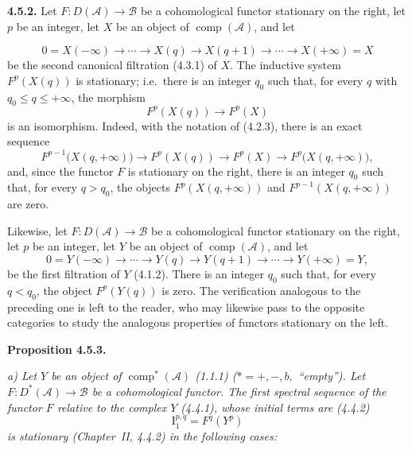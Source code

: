 \clearpage
{}%
\begingroup\small\setlength{\parskip}{0pt}\setlength{\emergencystretch}{1.5em}
\setlength{\abovedisplayskip}{4pt plus 2pt minus 2pt}%
\setlength{\belowdisplayskip}{4pt plus 2pt minus 2pt}%

\noindent\textbf{4.5.2.}\quad
Let $F\colon D(\mathcal A)\longrightarrow\mathcal B$ be a cohomological
functor stationary on the right, let $p$ be an integer, let $X$ be an
object of $\operatorname{comp}(\mathcal A)$, and let

\[
0=X(-\infty)\longrightarrow\cdots\longrightarrow X(q)
\longrightarrow X(q+1)\longrightarrow\cdots
\longrightarrow X(+\infty)=X
\]
be the second canonical filtration (4.3.1) of $X$. The inductive system
$F^p(X(q))$ is stationary; i.e.\ there is an integer $q_0$ such that, for
every $q$ with $q_0\leq q\leq+\infty$, the morphism
\[
F^p(X(q))\longrightarrow F^p(X)
\]
is an isomorphism. Indeed, with the notation of (4.2.3), there is an exact
sequence
\[
F^{p-1}\bigl(X(q,+\infty)\bigr)\longrightarrow F^p(X(q))
\longrightarrow F^p(X)\longrightarrow F^p\bigl(X(q,+\infty)\bigr),
\]
and, since the functor $F$ is stationary on the right, there is an integer
$q_0$ such that, for every $q>q_0$, the objects $F^p(X(q,+\infty))$ and
$F^{p-1}(X(q,+\infty))$ are zero.

Likewise, let $F\colon D(\mathcal A)\longrightarrow\mathcal B$ be a
cohomological functor stationary on the right, let $p$ be an integer, let
$Y$ be an object of $\operatorname{comp}(\mathcal A)$, and let
\[
0=Y(-\infty)\longrightarrow\cdots\longrightarrow Y(q)
\longrightarrow Y(q+1)\longrightarrow\cdots
\longrightarrow Y(+\infty)=Y,
\]
be the first filtration of $Y$ (4.1.2). There is an integer $q_0$ such that,
for every $q<q_0$, the object $F^p(Y(q))$ is zero. The verification analogous
to the preceding one is left to the reader, who may likewise pass to the
opposite categories to study the analogous properties of functors
stationary on the left.

\medskip\noindent\textbf{Proposition 4.5.3.}\quad

\noindent\textit{a) Let $Y$ be an object of
$\operatorname{comp}^{*}(\mathcal A)$ (1.1.1)
($*=+,-,b,{}$ ``empty''). Let
$F\colon D^*(\mathcal A)\longrightarrow\mathcal B$ be a cohomological
functor. The first spectral sequence of the functor $F$ relative to the
complex $Y$ (4.4.1), whose initial terms are (4.4.2)}
\[
\textit{$\mathrm{I}_1^{p,q}=F^q(Y^p)$}
\]
\textit{is stationary (Chapter~II, 4.4.2) in the following cases:}

